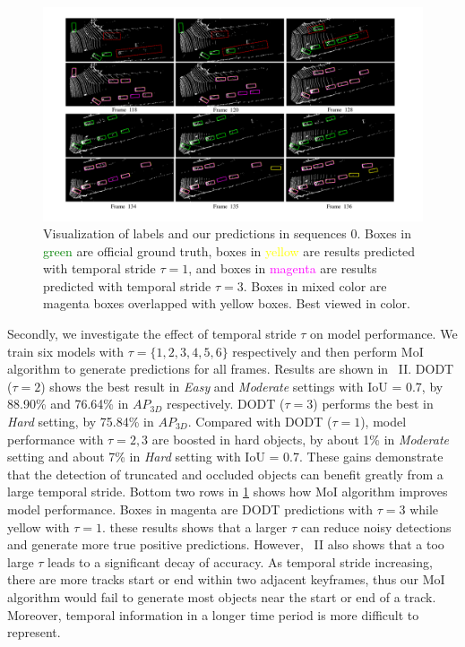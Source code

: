 \documentclass[letterpaper, 10pt, conference]{ieeeconf}  %
\begin{document}
\begin{figure}\centering
	\vspace{0.15cm}
	\begin{center}
		\includegraphics[trim={2cm, 1cm, 2.5cm, 1cm}, clip, width=\textwidth]{images/examples.pdf}
	\end{center}
	\setlength{\abovecaptionskip}{-3pt} 
	\caption{Visualization of labels and our predictions in sequences 0. Boxes in \textcolor{green}{green} are official ground truth, boxes in \textcolor{yellow}{yellow} are results predicted with temporal stride $\tau = 1$, and boxes in \textcolor{magenta}{magenta} are results predicted with temporal stride $\tau = 3$. Boxes in mixed color are magenta boxes overlapped with yellow boxes. Best viewed in color.}
	\label{fig:examples}
	\vspace{-0.6cm}
\end{figure}

Secondly, we investigate the effect of temporal stride $\tau$ on model performance. We train six models with $\tau = \{1, 2, 3, 4, 5, 6\}$ respectively and then perform MoI algorithm to generate predictions for all frames. Results are shown in \tablename \, II. DODT ($\tau = 2$) shows the best result in \textit{Easy} and \textit{Moderate} settings with IoU = 0.7, by 88.90\% and 76.64\% in $AP_{3D}$ respectively. DODT ($\tau = 3$) performs the best in \textit{Hard} setting, by 75.84\% in $AP_{3D}$. Compared with DODT ($\tau = 1$), model performance with $\tau = 2, 3$ are boosted in hard objects, by about 1\% in \textit{Moderate} setting and about 7\% in \textit{Hard} setting with IoU = 0.7. These gains demonstrate that the detection of truncated and occluded objects can benefit greatly from a large temporal stride. Bottom two rows in \figurename \ref{fig:examples} shows how MoI algorithm improves model performance. Boxes in magenta are DODT predictions with $\tau = 3$ while yellow with $\tau = 1$. these results shows that a larger $\tau$ can reduce noisy detections and generate more true positive predictions. However,  \tablename \, II also shows that a too large $\tau$ leads to a significant decay of accuracy. As temporal stride increasing, there are more tracks start or end within two adjacent keyframes, thus our MoI algorithm would fail to generate most objects near the start or end of a track. Moreover, temporal information in a longer time period is more difficult to represent.
\end{document}
